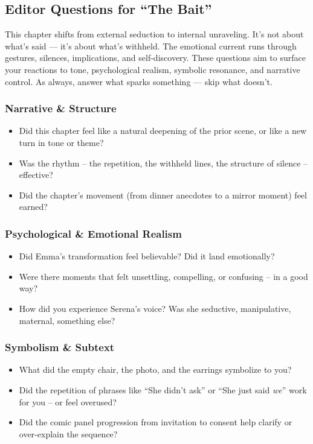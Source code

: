 \subsection*{Editor Questions for ``The Bait''}

This chapter shifts from external seduction to internal unraveling. It’s not about what’s said — it’s about what’s withheld. The emotional current runs through gestures, silences, implications, and self-discovery. These questions aim to surface your reactions to tone, psychological realism, symbolic resonance, and narrative control. As always, answer what sparks something — skip what doesn’t.

\subsubsection{Narrative \& Structure}

\begin{itemize}
  \item Did this chapter feel like a natural deepening of the prior scene, or like a new turn in tone or theme?
  \item Was the rhythm -- the repetition, the withheld lines, the structure of silence -- effective?
  \item Did the chapter’s movement (from dinner anecdotes to a mirror moment) feel earned?
\end{itemize}

\subsubsection{Psychological \& Emotional Realism}

\begin{itemize}
  \item Did Emma’s transformation feel believable? Did it land emotionally?
  \item Were there moments that felt unsettling, compelling, or confusing -- in a good way?
  \item How did you experience Serena’s voice? Was she seductive, manipulative, maternal, something else?
\end{itemize}

\subsubsection{Symbolism \& Subtext}

\begin{itemize}
  \item What did the empty chair, the photo, and the earrings symbolize to you?
  \item Did the repetition of phrases like ``She didn’t ask'' or ``She just said \textit{we}'' work for you -- or feel overused?
  \item Did the comic panel progression from invitation to consent help clarify or over-explain the sequence?
\end{itemize}

